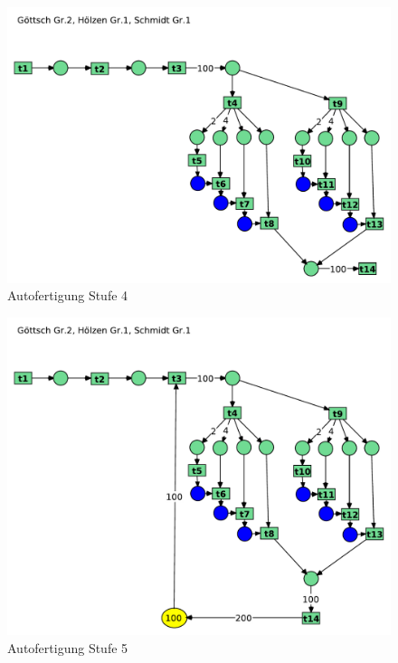 \documentclass[12pt, paper=a4]{article}
\begin{document}
\begin{figure}[h!]
\centering
\includegraphics[scale=0.55]{7-5-4.pdf}
\caption{Autofertigung Stufe 4}
\end{figure}

\begin{figure}[h!]
\centering
\includegraphics[scale=0.55]{7-5-5.pdf}
\caption{Autofertigung Stufe 5}
\end{figure}
\end{document}
